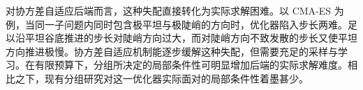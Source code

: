对协方差自适应后端而言，这种失配直接转化为实际求解困难。以 CMA-ES 为例，当同一子问题内同时包含极平坦与极陡峭的方向时，优化器陷入步长两难。足以沿平坦谷底推进的步长对陡峭方向过大，而对陡峭方向不致发散的步长又使平坦方向推进极慢。协方差自适应机制能逐步缓解这种失配，但需要充足的采样与学习。在有限预算下，分组所决定的局部条件性可明显增加后端的实际求解难度。相比之下，现有分组研究对这一优化器实际面对的局部条件性着墨甚少。